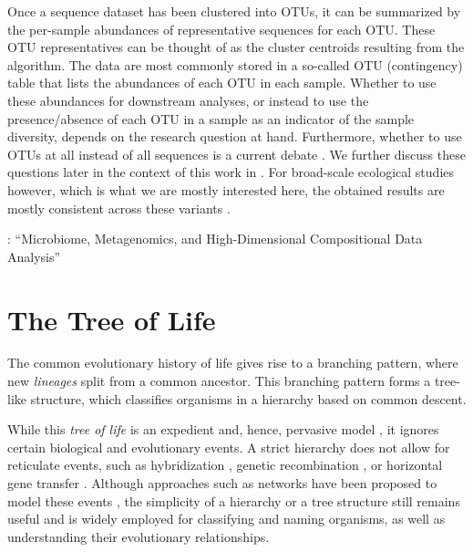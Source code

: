 Once a sequence dataset has been clustered into \acp{OTU},
it can be summarized by the per-sample abundances of representative sequences for each \ac{OTU}.
These \ac{OTU} representatives can be thought of as the cluster centroids resulting from the algorithm.
The data are most commonly stored in a so-called OTU (contingency) table
that lists the abundances of each \ac{OTU} in each sample.
Whether to use these abundances for downstream analyses,
or instead to use the presence/absence of each \ac{OTU} in a sample as an indicator of the sample diversity,
depends on the research question at hand.
Furthermore, whether to use \acp{OTU} at all instead of all sequences is a current debate \cite{Callahan2017,Glassman2018}.
We further discuss these questions later in the context of this work in
.
For broad-scale ecological studies however, which is what we are mostly interested here,
the obtained results are mostly consistent across these variants \cite{Glassman2018}.


\cite{Li2015a}: ``Microbiome, Metagenomics, and High-Dimensional Compositional Data Analysis''


\section{The Tree of Life}
\label{ch:Foundations:sec:TreeOfLife}

The common evolutionary history of life gives rise to a branching pattern,
where new \emph{lineages} split from a common ancestor.
This branching pattern forms a tree-like structure,
which classifies organisms in a hierarchy based on common descent.

While this \emph{tree of life} is an expedient and, hence, pervasive model \cite{Mindell2013,Hug2016},
it ignores certain biological and evolutionary events.
A strict hierarchy does not allow for reticulate events,
such as hybridization \cite{Maddison1997a}, genetic recombination \cite{Hein1993},
or horizontal gene transfer \cite{Ochman2000,DunningHotopp2011,Robinson2013}.
Although approaches such as networks have been proposed to model these events \cite{Cardona2008a,Huson2011a},
the simplicity of a hierarchy or a tree structure still remains useful and
is widely employed for classifying and naming organisms, as well as understanding their evolutionary relationships.

